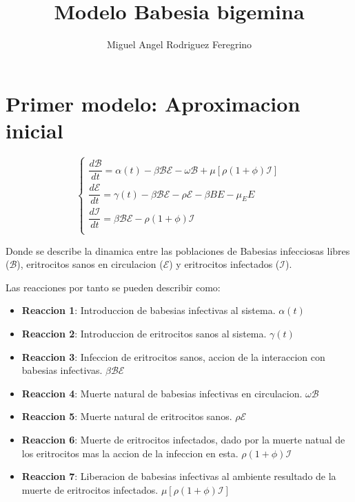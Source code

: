 \documentclass[11pt,a4paper]{article}
\author{Miguel Angel Rodriguez Feregrino}
\title{Modelo Babesia bigemina}
\begin{document}
\maketitle

\section{Primer modelo: Aproximacion inicial}

\begin{equation} 
\left\{\begin{array}{l}
\dfrac{d\mathscr{B}}{dt}
=
\alpha(t)- \beta \mathscr{B}\mathscr{E} - \omega \mathscr{B} + \mu [\rho(1+\phi ) \mathscr{I}]
\\
\dfrac{d\mathscr{E}}{dt}
=
\gamma (t) - \beta \mathscr{B}\mathscr{E} -\rho \mathscr{E} 
- \beta BE -\mu_E E 
\\
\dfrac{d\mathscr{I}}{dt}
=
\beta \mathscr{B}\mathscr{E} - \rho (1+\phi )\mathscr{I}
\\
    \end{array}\right.
\end{equation}

Donde se describe la dinamica entre las poblaciones de Babesias infecciosas libres ($\mathscr{B}$), eritrocitos sanos en circulacion ($\mathscr{E}$) y eritrocitos infectados ($\mathscr{I}$).

Las reacciones por tanto se pueden describir como:

\begin{itemize}
\item \textbf{Reaccion 1}: Introduccion de babesias infectivas al sistema. $\alpha(t)$
\item \textbf{Reaccion 2}: Introduccion de eritrocitos sanos al sistema. $\gamma (t)$
\item \textbf{Reaccion 3}: Infeccion de eritrocitos sanos, accion de la interaccion con babesias infectivas. $\beta \mathscr{B}\mathscr{E}$
\item \textbf{Reaccion 4}: Muerte natural de babesias infectivas en circulacion. $\omega \mathscr{B}$
\item \textbf{Reaccion 5}: Muerte natural de eritrocitos sanos. $\rho \mathscr{E}$
\item \textbf{Reaccion 6}: Muerte de eritrocitos infectados, dado por la muerte natual de los eritrocitos mas la accion de la infeccion en esta. $\rho (1+\phi )\mathscr{I}$
\item \textbf{Reaccion 7}: Liberacion de babesias infectivas al ambiente resultado de la muerte de eritrocitos infectados. $\mu [\rho(1+\phi ) \mathscr{I}]$

\end{itemize}
\end{document}
